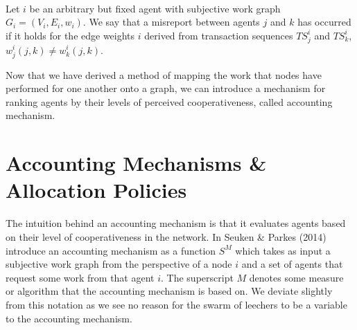 \begin{definition}\ \\
\label{def:Misreport on Subjective Work Graph}
\noindent{}Let $i$ be an arbitrary but fixed agent with subjective work graph $G_i=(V_i,E_i,w_i)$. We say that a misreport between agents $j$ and $k$ has occurred if it holds for the edge weights $i$ derived from transaction sequences $TS_j^i$ and $TS_k^i$, $w^i_j(j,k)\neq{}w^i_k(j,k)$.
\end{definition}

\noindent{}Now that we have derived a method of mapping the work that nodes have performed for one another onto a graph, we can introduce a mechanism for ranking agents by their levels of perceived cooperativeness, called accounting mechanism.\vspace{1em}\\

\section{Accounting Mechanisms \& Allocation Policies}
\label{sec:Accounting Mechanisms & Allocation Policies}
\noindent{}The intuition behind an accounting mechanism is that it evaluates agents based on their level of cooperativeness in the network. In \cite{Sybil-proof Accounting Mechanisms with Transitive Trust} Seuken \& Parkes (2014) introduce an accounting mechanism as a function $S^M$ which takes as input a subjective work graph from the perspective of a node $i$ and a set of agents that request some work from that agent $i$. The superscript $M$ denotes some measure or algorithm that the accounting mechanism is based on. We deviate slightly from this notation as we see no reason for the swarm of leechers to be a variable to the accounting mechanism.\vspace{1em}\\

